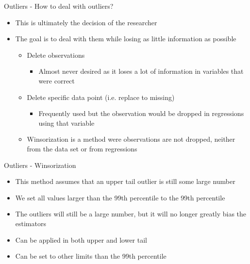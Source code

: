 \documentclass[aspectratio=169]{beamer}
\begin{document}
\begin{frame}{Outliers - How to deal with outliers?}
	\begin{itemize}
		\item This is ultimately the decision of the researcher
		\item The goal is to deal with them while losing as little information as possible
		\begin{itemize}
			\item Delete observations
			\begin{itemize}
				\item Almost never desired as it loses a lot of information in variables that were correct
			\end{itemize}
			\item Delete specific data point (i.e. replace to missing)
			\begin{itemize}
				\item Frequently used but the observation would be dropped in regressions using that variable
			\end{itemize}
			\item Winsorization is a method were observations are not dropped, neither from the data set or from regressions
		\end{itemize}
	\end{itemize}
\end{frame}

\begin{frame}{Outliers - Winsorization}
	\begin{itemize}
		\item This method assumes that an upper tail outlier is still some large number
		\item We set all values larger than the 99th percentile to the 99th percentile
		\item The outliers will still be a large number, but it will no longer greatly bias the estimators
		\item Can be applied in both upper and lower tail
		\item Can be set to other limits than the 99th percentile
	\end{itemize}
\end{frame}
\end{document}
